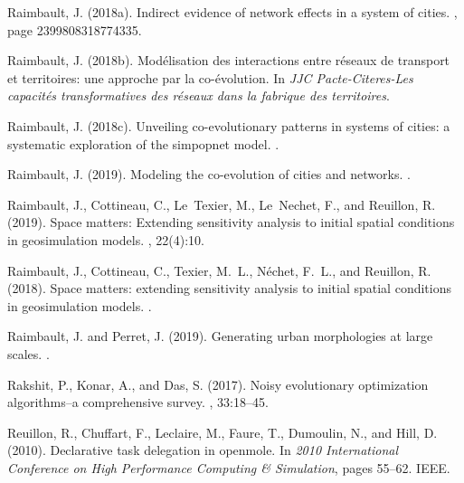\documentclass[10pt]{article}
\begin{document}
\begin{thebibliography}{}
Raimbault, J. (2018a).
\newblock Indirect evidence of network effects in a system of cities.
,
  page 2399808318774335.

Raimbault, J. (2018b).
\newblock Mod{\'e}lisation des interactions entre r{\'e}seaux de transport et
  territoires: une approche par la co-{\'e}volution.
\newblock In {\em JJC Pacte-Citeres-Les capacit{\'e}s transformatives des
  r{\'e}seaux dans la fabrique des territoires}.

Raimbault, J. (2018c).
\newblock Unveiling co-evolutionary patterns in systems of cities: a systematic
  exploration of the simpopnet model.
.

Raimbault, J. (2019).
\newblock Modeling the co-evolution of cities and networks.
.

Raimbault, J., Cottineau, C., Le~Texier, M., Le~Nechet, F., and Reuillon, R.
  (2019).
\newblock Space matters: Extending sensitivity analysis to initial spatial
  conditions in geosimulation models.
,
  22(4):10.

Raimbault, J., Cottineau, C., Texier, M.~L., N{\'e}chet, F.~L., and Reuillon,
  R. (2018).
\newblock Space matters: extending sensitivity analysis to initial spatial
  conditions in geosimulation models.
.

Raimbault, J. and Perret, J. (2019).
\newblock Generating urban morphologies at large scales.
.

Rakshit, P., Konar, A., and Das, S. (2017).
\newblock Noisy evolutionary optimization algorithms--a comprehensive survey.
, 33:18--45.

Reuillon, R., Chuffart, F., Leclaire, M., Faure, T., Dumoulin, N., and Hill, D.
  (2010).
\newblock Declarative task delegation in openmole.
\newblock In {\em 2010 International Conference on High Performance Computing
  \& Simulation}, pages 55--62. IEEE.


\end{thebibliography}
\end{document}
